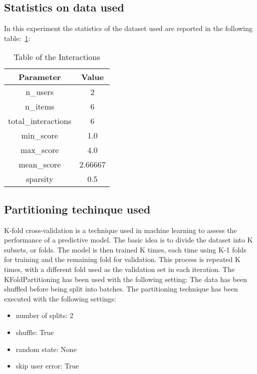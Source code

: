 \documentclass[11pt]{article}
\begin{document}
\subsection{Statistics on data used}\label{subsec:stats}
In this experiment the statistics of the dataset used are reported in the following table:~\ref{tab:dataset_table}:
\begin{table}[ht]
    \centering
  \begin{tabular}{|c|c|}
    \hline
    \textbf{Parameter}& \textbf{Value} \\ \hline
    n\_users  & 2\\ \hline
    n\_items  & 6\\ \hline
    total\_interactions  & 6\\ \hline
    min\_score  & 1.0\\ \hline
    max\_score  & 4.0\\ \hline
    mean\_score  & 2.66667\\ \hline
    sparsity  & 0.5\\ \hline
  \end{tabular}
   \caption{Table of the Interactions}\label{tab:dataset_table}
\end{table}
\hfill\break
\hfill\break


\subsection{Partitioning techinque used}\label{subsec:partitioning}
K-fold cross-validation is a technique used in machine learning to assess the performance of a predictive model.
The basic idea is to divide the dataset into K subsets, or folds.
The model is then trained K times, each time using K-1 folds for training and the remaining fold for validation.
This process is repeated K times, with a different fold used as the validation set in each iteration.
\hfill\break
\hfill\break
The KFoldPartitioning has been used with the following setting:
\hfill\break
\hfill\break
The data has been shuffled before being split into batches.
The partitioning technique has been executed with the following settings:
\begin{itemize}
    \item number of splits: 2
    \item shuffle: True
    \item random state: None
    \item skip user error: True
\end{itemize}
\hfill\break
\hfill\break
\end{document}
